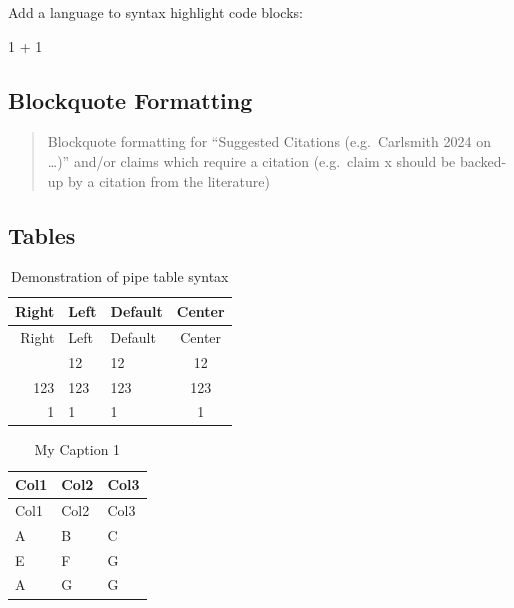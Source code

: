 \documentclass[
  11pt,
  letterpaper,
]{book}
\newenvironment{Shaded}{\begin{snugshade}}{\end{snugshade}}
\newcommand{\DecValTok}[1]{\textcolor[rgb]{0.68,0.00,0.00}{#1}}
\newcommand{\OperatorTok}[1]{\textcolor[rgb]{0.37,0.37,0.37}{#1}}
\begin{document}
Add a language to syntax highlight code blocks:

\begin{Shaded}
\begin{Highlighting}[]
\DecValTok{1} \OperatorTok{+} \DecValTok{1}
\end{Highlighting}
\end{Shaded}

\subsection{Blockquote Formatting}\label{blockquote-formatting-1}

\begin{quote}
Blockquote formatting for ``Suggested Citations (e.g.~Carlsmith 2024 on
\ldots)'' and/or claims which require a citation (e.g.~claim x should be
backed-up by a citation from the literature)
\end{quote}

\subsection{Tables}\label{tables-1}

\begin{longtable}[]{@{}rllc@{}}
\caption{Demonstration of pipe table
syntax}\label{tbl-letters}\tabularnewline
\toprule\noalign{}
Right & Left & Default & Center \\
\midrule\noalign{}
\endfirsthead
\toprule\noalign{}
Right & Left & Default & Center \\
\midrule\noalign{}
\endhead
\bottomrule\noalign{}
\endlastfoot
12 & 12 & 12 & 12 \\
123 & 123 & 123 & 123 \\
1 & 1 & 1 & 1 \\
\end{longtable}

\begin{longtable}[]{@{}lll@{}}
\caption{My Caption 1}\label{tbl-letters}\tabularnewline
\toprule\noalign{}
Col1 & Col2 & Col3 \\
\midrule\noalign{}
\endfirsthead
\toprule\noalign{}
Col1 & Col2 & Col3 \\
\midrule\noalign{}
\endhead
\bottomrule\noalign{}
\endlastfoot
A & B & C \\
E & F & G \\
A & G & G \\
\end{longtable}
\end{document}

